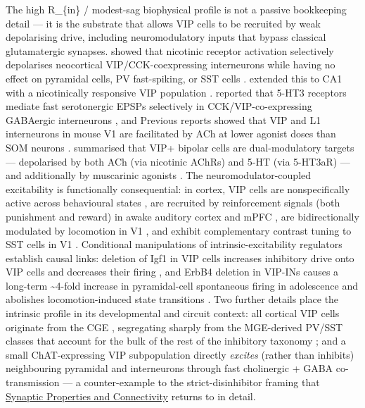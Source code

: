 \documentclass[11pt]{article}
\begin{document}
The high R\_\{in\} / modest-sag biophysical profile is not a passive bookkeeping detail --- it is the substrate that allows VIP cells to be recruited by weak depolarising drive, including neuromodulatory inputs that bypass classical glutamatergic synapses. \citet{Porter1999} showed that nicotinic receptor activation selectively depolarises neocortical VIP/CCK-coexpressing interneurons while having no effect on pyramidal cells, PV fast-spiking, or SST cells \citep{Porter1999}. \citet{Bell2015} extended this to CA1 with a nicotinically responsive VIP population \citep{Bell2015}. \citet{Ferezou2002} reported that 5-HT3 receptors mediate fast serotonergic EPSPs selectively in CCK/VIP-co-expressing GABAergic interneurons \citep{Ferezou2002}, and Previous reports \citep{Chen2015a} showed that VIP and L1 interneurons in mouse V1 are facilitated by ACh at lower agonist doses than SOM neurons \citep{Chen2015a}. \citet{Tremblay2016} summarised that VIP+ bipolar cells are dual-modulatory targets --- depolarised by both ACh (via nicotinic AChRs) and 5-HT (via 5-HT3aR) --- and additionally by muscarinic agonists \citep{Tremblay2016}. The neuromodulator-coupled excitability is functionally consequential: in cortex, VIP cells are nonspecifically active across behavioural states \citep{Jackson2016}, are recruited by reinforcement signals (both punishment and reward) in awake auditory cortex and mPFC \citep{Pi2013}, are bidirectionally modulated by locomotion in V1 \citep{Guetmccreight2020b}, and exhibit complementary contrast tuning to SST cells in V1 \citep{Millman2020}. Conditional manipulations of intrinsic-excitability regulators establish causal links: deletion of Igf1 in VIP cells increases inhibitory drive onto VIP cells and decreases their firing \citep{Mardinly2016}, and ErbB4 deletion in VIP-INs causes a long-term {\textasciitilde}4-fold increase in pyramidal-cell spontaneous firing in adolescence and abolishes locomotion-induced state transitions \citep{Batistabrito2017}. Two further details place the intrinsic profile in its developmental and circuit context: all cortical VIP cells originate from the CGE \citep{Lim2018, Cauli2014}, segregating sharply from the MGE-derived PV/SST classes that account for the bulk of the rest of the inhibitory taxonomy \citep{Rudy2011, Karnani2016a}; and a small ChAT-expressing VIP subpopulation directly \textit{excites} (rather than inhibits) neighbouring pyramidal and interneurons through fast cholinergic + GABA co-transmission \citep{Obermayer2019} --- a counter-example to the strict-disinhibitor framing that \href{/synaptic-properties}{Synaptic Properties and Connectivity} returns to in detail.
\end{document}

